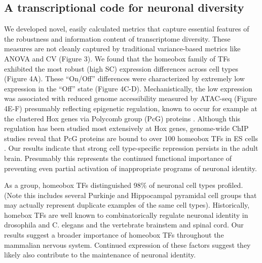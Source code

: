 \subsection{A transcriptional code for neuronal diversity}
We developed novel, easily calculated metrics that capture essential features of the robustness and information content of transcriptome diversity. These measures are not cleanly captured by traditional variance-based metrics like ANOVA and CV (Figure 3). We found that the homeobox family of TFs exhibited the most robust (high SC) expression differences across cell types (Figure 4A). These “On/Off” differences were characterized by extremely low expression in the “Off” state (Figure 4C-D). Mechanistically, the low expression was associated with reduced genome accessibility measured by ATAC-seq (Figure 4E-F) presumably reflecting epigenetic regulation, known to occur for example at the clustered Hox genes via Polycomb group (PcG) proteins \cite{Montavon_2014}. Although this regulation has been studied most extensively at Hox genes, genome-wide ChIP studies reveal that PcG proteins are bound to over 100 homeobox TFs in ES cells \cite{Boyer_2006}. Our results indicate that strong cell type-specific repression persists in the adult brain. Presumably this represents the continued functional importance of preventing even partial activation of inappropriate programs of neuronal identity. 

As a group, homeobox TFs distinguished 98\% of neuronal cell types profiled. (Note this includes several Purkinje and Hippocampal pyramidal cell groups that may actually represent duplicate examples of the same cell types). Historically, homebox TFs are well known to combinatorically regulate neuronal identity in drosophila and C. elegans \cite{Kratsios_2017} and the vertebrate brainstem and spinal cord\cite{Dasen_2009}\cite{Philippidou_2013}. Our results suggest a broader importance of homeobox TFs throughout the mammalian nervous system. Continued expression of these factors suggest they likely also contribute to the maintenance of neuronal identity.


